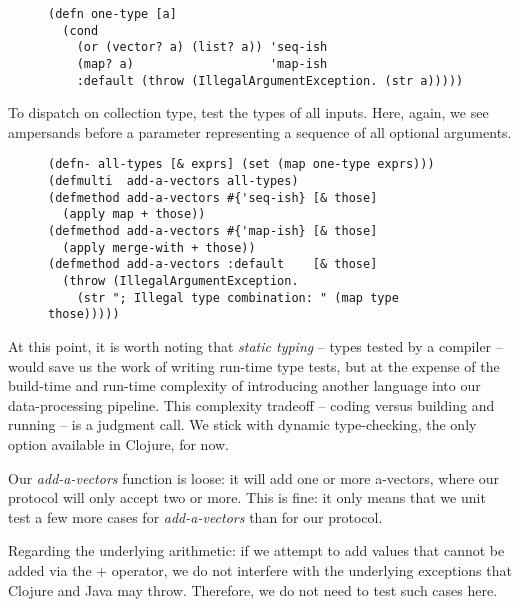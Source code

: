 \documentclass[11pt]{article}
\begin{document}
\begin{figure}[H]
\label{one-type}
\begin{verbatim}
(defn one-type [a]
  (cond
    (or (vector? a) (list? a)) 'seq-ish
    (map? a)                   'map-ish
    :default (throw (IllegalArgumentException. (str a)))))
\end{verbatim}
\end{figure}

To dispatch on collection type, test the types of all inputs. Here,
again, we see ampersands before a parameter representing a sequence
of all optional arguments.

\begin{figure}[H]
\label{add-a-vectors}
\begin{verbatim}
(defn- all-types [& exprs] (set (map one-type exprs)))
(defmulti  add-a-vectors all-types)
(defmethod add-a-vectors #{'seq-ish} [& those]
  (apply map + those))
(defmethod add-a-vectors #{'map-ish} [& those]
  (apply merge-with + those))
(defmethod add-a-vectors :default    [& those]
  (throw (IllegalArgumentException.
    (str "; Illegal type combination: " (map type those)))))
\end{verbatim}
\end{figure}

At this point, it is worth noting that \emph{static typing} -- types
tested by a compiler -- would save us the work of writing run-time
type tests, but at the expense of the build-time and run-time
complexity of introducing another language into our data-processing
pipeline. This complexity tradeoff -- coding versus building and
running -- is a judgment call.  We stick with dynamic type-checking,
the only option available in Clojure, for now.

Our \emph{add-a-vectors} function is loose: it will add one or more
a-vectors, where our protocol will only accept two or more. This is
fine: it only means that we unit test a few more cases for
\emph{add-a-vectors} than for our protocol.

Regarding the underlying arithmetic: if we attempt to add values that
cannot be added via the $+$ operator, we do not interfere with the
underlying exceptions that Clojure and Java may throw. Therefore, we
do not need to test such cases here.
\end{document}
